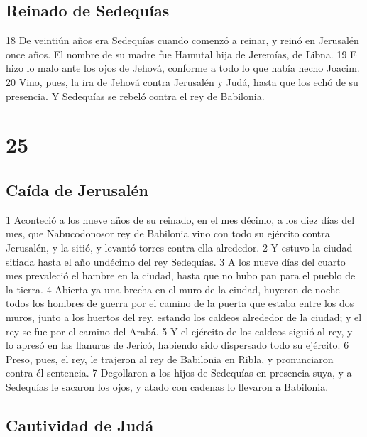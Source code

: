 \section*{Reinado de Sedequías}

 
18 De veintiún años era Sedequías cuando comenzó a reinar, y reinó en Jerusalén once años. El nombre de su madre fue Hamutal hija de Jeremías, de Libna.
19 E hizo lo malo ante los ojos de Jehová, conforme a todo lo que había hecho Joacim.
20 Vino, pues, la ira de Jehová contra Jerusalén y Judá, hasta que los echó de su presencia. Y Sedequías se rebeló contra el rey de Babilonia. 

\chapter{25}

\section*{Caída de Jerusalén }


1 Aconteció a los nueve años de su reinado, en el mes décimo, a los diez días del mes, que Nabucodonosor rey de Babilonia vino con todo su ejército contra Jerusalén, y la sitió, y levantó torres contra ella alrededor. 
2 Y estuvo la ciudad sitiada hasta el año undécimo del rey Sedequías.
3 A los nueve días del cuarto mes prevaleció el hambre en la ciudad, hasta que no hubo pan para el pueblo de la tierra.
4 Abierta ya una brecha en el muro de la ciudad, huyeron de noche todos los hombres de guerra por el camino de la puerta que estaba entre los dos muros, junto a los huertos del rey, estando los caldeos alrededor de la ciudad; y el rey se fue por el camino del Arabá.
5 Y el ejército de los caldeos siguió al rey, y lo apresó en las llanuras de Jericó, habiendo sido dispersado todo su ejército.
6 Preso, pues, el rey, le trajeron al rey de Babilonia en Ribla, y pronunciaron contra él sentencia.
7 Degollaron a los hijos de Sedequías en presencia suya, y a Sedequías le sacaron los ojos, y atado con cadenas lo llevaron a Babilonia. 
\section*{Cautividad de Judá}

